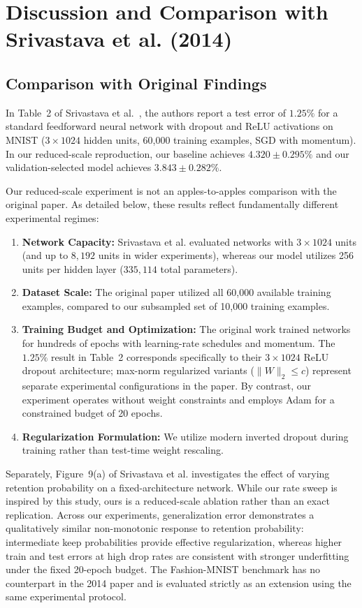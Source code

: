 \documentclass[conference]{IEEEtran}
\begin{document}
\section{Discussion and Comparison with Srivastava et al. (2014)}

\subsection{Comparison with Original Findings}
In Table~2 of Srivastava et al.~\cite{srivastava2014dropout}, the authors report a test error of $1.25\%$ for a standard feedforward neural network with dropout and ReLU activations on MNIST ($3 \times 1024$ hidden units, 60,000 training examples, SGD with momentum). In our reduced-scale reproduction, our baseline achieves $4.320 \pm 0.295\%$ and our validation-selected model achieves $3.843 \pm 0.282\%$.

Our reduced-scale experiment is not an apples-to-apples comparison with the original paper. As detailed below, these results reflect fundamentally different experimental regimes:
\begin{enumerate}
\item \textbf{Network Capacity:} Srivastava et al. evaluated networks with $3 \times 1024$ units (and up to $8{,}192$ units in wider experiments), whereas our model utilizes 256 units per hidden layer ($335{,}114$ total parameters).
\item \textbf{Dataset Scale:} The original paper utilized all 60,000 available training examples, compared to our subsampled set of 10,000 training examples.
\item \textbf{Training Budget and Optimization:} The original work trained networks for hundreds of epochs with learning-rate schedules and momentum. The $1.25\%$ result in Table~2 corresponds specifically to their $3 \times 1024$ ReLU dropout architecture; max-norm regularized variants ($\|W\|_2 \le c$) represent separate experimental configurations in the paper. By contrast, our experiment operates without weight constraints and employs Adam for a constrained budget of 20 epochs.
\item \textbf{Regularization Formulation:} We utilize modern inverted dropout during training rather than test-time weight rescaling.
\end{enumerate}

Separately, Figure~9(a) of Srivastava et al. investigates the effect of varying retention probability on a fixed-architecture network. While our rate sweep is inspired by this study, ours is a reduced-scale ablation rather than an exact replication. Across our experiments, generalization error demonstrates a qualitatively similar non-monotonic response to retention probability: intermediate keep probabilities provide effective regularization, whereas higher train and test errors at high drop rates are consistent with stronger underfitting under the fixed 20-epoch budget. The Fashion-MNIST benchmark has no counterpart in the 2014 paper and is evaluated strictly as an extension using the same experimental protocol.
\end{document}
